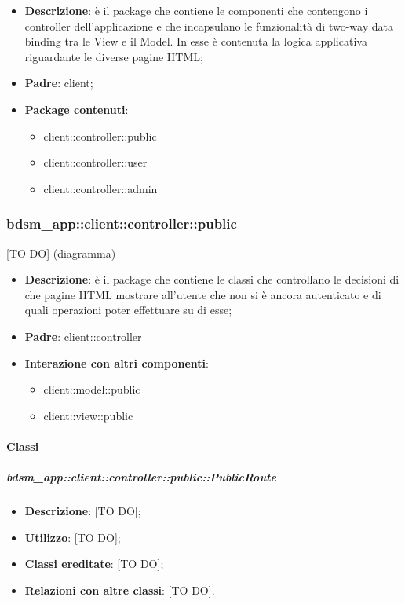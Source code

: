 \begin{itemize}
	\item \textbf{Descrizione}: è il package che contiene le componenti che contengono i controller dell'applicazione e che incapsulano le funzionalità di two-way data binding tra le View e il Model. In esse è contenuta la logica applicativa riguardante le diverse pagine HTML;
	\item \textbf{Padre}: client;
	\item \textbf{Package contenuti}:
		\begin{itemize}
			\item client::controller::public
			\item client::controller::user
			\item client::controller::admin
		\end{itemize}
\end{itemize}


\subsubsection{bdsm\_app::client::controller::public} %
\label{ssub:bdsm_app_client_controller_public}
[TO DO] (diagramma) \newline \newline

\begin{itemize}
	\item \textbf{Descrizione}: è il package che contiene le classi che controllano le decisioni di che pagine HTML mostrare all'utente che non si è ancora autenticato e di quali operazioni poter effettuare su di esse;
	\item \textbf{Padre}: client::controller
	\item \textbf{Interazione con altri componenti}:
		\begin{itemize}
			\item client::model::public
			\item client::view::public
		\end{itemize}
\end{itemize}

	\paragraph{Classi} %
		\subparagraph{bdsm\_app::client::controller::public::PublicRoute} %
		\label{subp:bdsm_app_client_controller_public_publicrouteconfig}
		\begin{itemize}
			\item \textbf{Descrizione}: [TO DO];
			\item \textbf{Utilizzo}: [TO DO];
			\item \textbf{Classi ereditate}: [TO DO];
			\item \textbf{Relazioni con altre classi}: [TO DO].
		\end{itemize}

